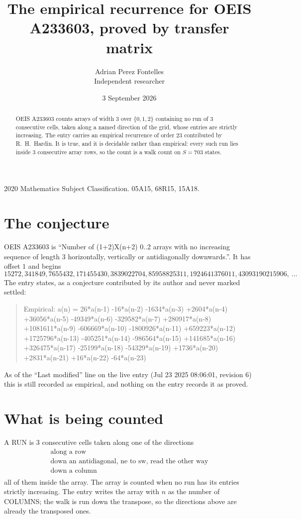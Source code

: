\documentclass[11pt,a4paper]{article}
\title{The empirical recurrence for OEIS A233603, proved by transfer matrix}
\author{Adrian Perez Fontelles\\ \small Independent researcher}
\date{3 September 2026}
\theoremstyle{plain}
\theoremstyle{definition}
\begin{document}
\maketitle

\begin{abstract}
OEIS A233603 counts arrays of width $3$ over $\{0,1,2\}$ containing no run of $3$ consecutive
cells, taken along a named direction of the grid, whose entries are strictly increasing. The entry carries
an empirical recurrence of order $23$ contributed by R.~H.~Hardin. It is true, and it is
decidable rather than empirical: every such run lies inside $3$ consecutive array rows, so
the count is a walk count on $S=703$ states.
\end{abstract}

\noindent\small 2020 Mathematics Subject Classification. 05A15, 68R15, 15A18.\normalsize

\section{The conjecture}

OEIS A233603 is ``Number of (1+2)X(n+2) 0..2 arrays with no increasing sequence of length 3 horizontally, vertically or antidiagonally downwards.''. It has offset $1$ and begins
\[
15272, 341849, 7655432, 171455430, 3839022704, 85958825311, 1924641376011, 43093190215906,\ \dots
\]
The entry states, as a conjecture contributed by its author and never marked settled:
\begin{quote}
Empirical: a(n) = 26*a(n-1) -16*a(n-2) -1634*a(n-3) +2604*a(n-4) +36056*a(n-5) -49349*a(n-6) -329582*a(n-7) +280917*a(n-8) +1081611*a(n-9) -606669*a(n-10) -1800926*a(n-11) +659223*a(n-12) +1725796*a(n-13) -405251*a(n-14) -986564*a(n-15) +141685*a(n-16) +326475*a(n-17) -25199*a(n-18) -54329*a(n-19) +1736*a(n-20) +2831*a(n-21) +16*a(n-22) -64*a(n-23)
\end{quote}
As of the ``Last modified'' line on the live entry (Jul 23 2025 08:06:01, revision 6) this is still
recorded as empirical, and nothing on the entry records it as proved.

\section{What is being counted}

A RUN is $3$ consecutive cells taken along one of the directions
\[
\begin{array}{l}
\text{along a row} \\
\text{down an antidiagonal, ne to sw, read the other way} \\
\text{down a column} \\
\end{array}
\]
all of them inside the array. The array is counted when no run has its entries strictly increasing. The entry writes the array with $n$ as the number of COLUMNS; the walk is run down the transpose, so the directions above are already the transposed ones.
\end{document}
